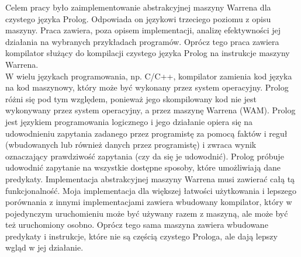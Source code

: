 Celem pracy było zaimplementowanie abstrakcyjnej maszyny Warrena dla czystego języka Prolog. Odpowiada on językowi trzeciego poziomu z opisu maszyny. Praca zawiera, poza opisem implementacji, analizę efektywności jej działania na wybranych przykładach programów.
Oprócz tego praca zawiera kompilator służący do kompilacji czystego języka Prolog na instrukcje maszyny Warrena.\\
W wielu językach programowania, np. C/C++, kompilator zamienia kod języka na kod maszynowy, który może być wykonany przez system operacyjny. Prolog różni się pod tym względem, ponieważ jego skompilowany kod nie jest wykonywany przez system operacyjny, a przez maszynę Warrena (WAM). Prolog jest językiem programowania logicznego i jego działanie opiera się na udowodnieniu zapytania zadanego przez programistę za pomocą faktów i reguł (wbudowanych lub również danych przez programistę) i zwraca wynik oznaczający prawdziwość zapytania (czy da się je udowodnić). Prolog próbuje udowodnić zapytanie na wszystkie dostępne sposoby, które umożliwiają dane predykaty. Implementacja abstrakcyjnej maszyny Warrena musi zawierać całą tą funkcjonalność. Moja implementacja dla większej łatwości użytkowania i lepszego porównania z innymi implementacjami zawiera wbudowany kompilator, który w pojedynczym uruchomieniu może być używany razem z maszyną, ale może być też uruchomiony osobno. Oprócz tego sama maszyna zawiera wbudowane predykaty i instrukcje, które nie są częścią czystego Prologa, ale dają lepszy wgląd w jej działanie.